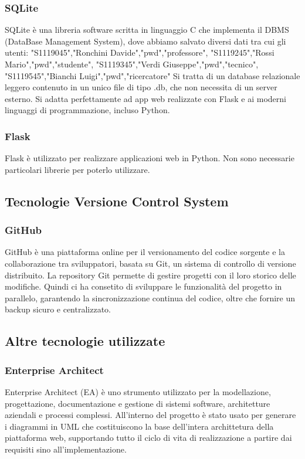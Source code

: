 \documentclass[11pt,a4paper]{report}
\begin{document}
\subsubsection{SQLite}
SQLite
è una libreria software scritta in linguaggio C che implementa il DBMS (DataBase Management System), dove abbiamo salvato diversi dati tra cui gli utenti:\newline
"S1119045","Ronchini Davide","pwd","professore",\newline
 "S1119245","Rossi Mario","pwd","studente",\newline
 "S1119345","Verdi Giuseppe","pwd","tecnico",\newline
 "S1119545","Bianchi Luigi","pwd","ricercatore"\newline
Si tratta di un database relazionale leggero contenuto in un unico file di tipo .db, che non necessita di un server esterno. 
Si adatta perfettamente ad app web realizzate con Flask e ai moderni linguaggi di programmazione, incluso Python.
\subsubsection{Flask}
Flask è utilizzato per realizzare applicazioni web in Python. Non sono necessarie particolari librerie per poterlo utilizzare.
\subsection{Tecnologie Versione Control System}
\subsubsection{GitHub}
GitHub è una piattaforma online per il versionamento del codice sorgente e la collaborazione tra sviluppatori, basata su Git, un sistema di controllo di versione distribuito.
La repository Git permette di gestire progetti con il loro storico delle modifiche. 
Quindi ci ha consetito di sviluppare le funzionalità del progetto in parallelo, garantendo la sincronizzazione
continua del codice, oltre che fornire un backup sicuro e centralizzato.
\subsection{Altre tecnologie utilizzate}
\subsubsection{Enterprise Architect}
Enterprise Architect (EA) è uno strumento utilizzato per la modellazione, progettazione, documentazione e gestione di sistemi software, architetture aziendali e processi complessi.
All'interno del progetto è stato usato per generare i diagrammi in UML che costituiscono la base dell'intera archittetura della piattaforma web, supportando 
tutto il ciclo di vita di realizzazione a partire dai requisiti sino all'implementazione. 
\end{document}
